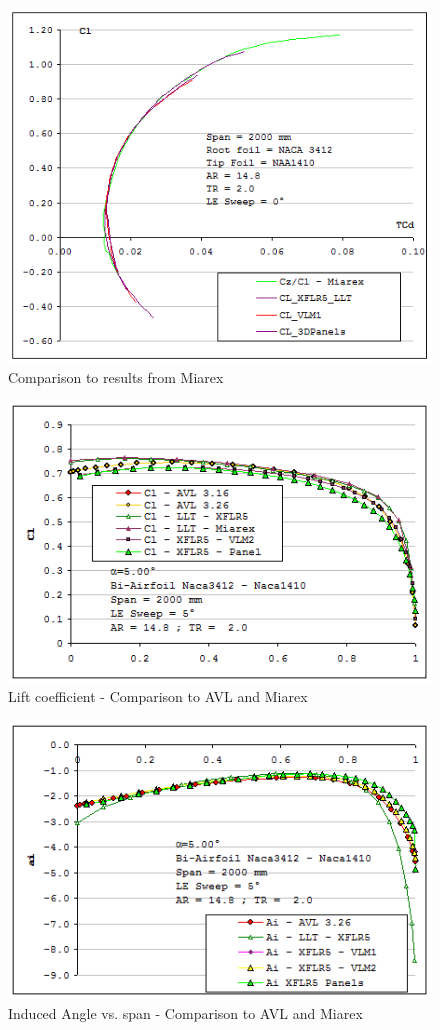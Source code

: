 \documentclass[a4paper,twoside,12pt,dvips]{article}
\begin{document}
\begin{figure}[htbp]
  \includegraphics[width=0.8\linewidth]{img-40}\centering 
  \caption{Comparison to results from Miarex}
  \label{fig:comparison_to_results_from_miarex}
\end{figure}

\begin{figure}[htbp]
  \includegraphics[width=0.8\linewidth]{img-41}\centering 
  \caption{Lift coefficient - Comparison to AVL and Miarex}
  \label{fig:lift_coefficient_comparison_to_avl_and_miarex}
\end{figure}

\begin{figure}[htbp]
  \includegraphics[width=0.8\linewidth]{img-42}\centering 
  \caption{Induced Angle vs. span - Comparison to AVL and Miarex}
  \label{fig:induced_angle_vs_span_comparison_to_avl_and_miarex}
\end{figure}
\end{document}
